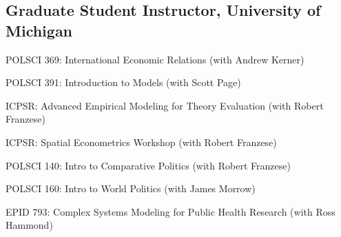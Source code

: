 \documentclass[letterpaper]{article}
\renewenvironment{itemize}{
  \begin{list}{}{
    \setlength{\leftmargin}{1.5em}
  }
}{
  \end{list}
}
\begin{document}
\subsection*{Graduate Student Instructor, University of Michigan}
\begin{itemize}
\item POLSCI 369: International Economic Relations (with Andrew Kerner) %
\item POLSCI 391: Introduction to Models (with Scott Page) %
\item ICPSR: Advanced Empirical Modeling for Theory Evaluation (with Robert Franzese) %
\item ICPSR: Spatial Econometrics Workshop (with Robert Franzese) %
\item POLSCI 140: Intro to Comparative Politics (with Robert Franzese) %
\item POLSCI 160: Intro to World Politics (with James Morrow) %
\item EPID 793: Complex Systems Modeling for Public Health Research (with Ross Hammond) %
\end{itemize}

\hrulefill
\end{document}
